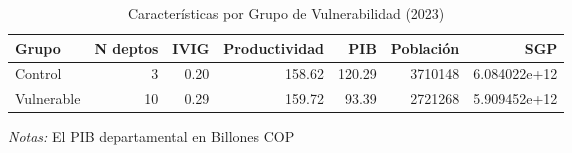 \documentclass[12pt]{article}
\begin{document}
\setcounter{table}{4}
\begin{table}[htbp]
\centering
\begin{threeparttable}

\caption{Características por Grupo de Vulnerabilidad (2023)}
\begin{tabular}[t]{lrrrrrr}
\toprule
Grupo & N deptos & IVIG & Productividad & PIB & Población & SGP\\
\midrule
Control & 3 & 0.20 & 158.62 & 120.29 & 3710148 & 6.084022e+12\\
Vulnerable & 10 & 0.29 & 159.72 & 93.39 & 2721268 & 5.909452e+12\\
\bottomrule
\end{tabular}
\begin{tablenotes}
\footnotesize
\item \textit{Notas:} El PIB departamental en Billones COP
\end{tablenotes}
\end{threeparttable}
\end{table}
\end{document}
